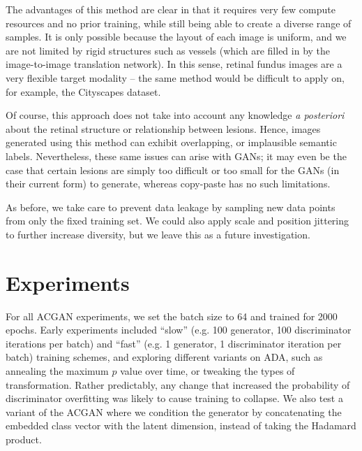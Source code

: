 The advantages of this method are clear in that it requires very few compute resources and no prior training, while still being able to create a diverse range of samples.
It is only possible because the layout of each image is uniform, and we are not limited by rigid structures such as vessels (which are filled in by the image-to-image translation network).
In this sense, retinal fundus images are a very flexible target modality -- the same method would be difficult to apply on, for example, the Cityscapes dataset.

Of course, this approach does not take into account any knowledge \emph{a posteriori} about the retinal structure or relationship between lesions.
Hence, images generated using this method can exhibit overlapping, or implausible semantic labels.
Nevertheless, these same issues can arise with GANs; it may even be the case that certain lesions are simply too difficult or too small for the GANs (in their current form) to generate, whereas copy-paste has no such limitations.

As before, we take care to prevent data leakage by sampling new data points from only the fixed training set.
We could also apply scale and position jittering to further increase diversity, but we leave this as a future investigation.

\section{Experiments}

For all ACGAN experiments, we set the batch size to 64 and trained for 2000 epochs.
Early experiments included ``slow'' (e.g. 100 generator, 100 discriminator iterations per batch) and ``fast'' (e.g. 1 generator, 1 discriminator iteration per batch) training schemes, and exploring different variants on ADA, such as annealing the maximum $p$ value over time, or tweaking the types of transformation.
Rather predictably, any change that increased the probability of discriminator overfitting was likely to cause training to collapse.
We also test a variant of the ACGAN where we condition the generator by concatenating the embedded class vector with the latent dimension, instead of taking the Hadamard product.

